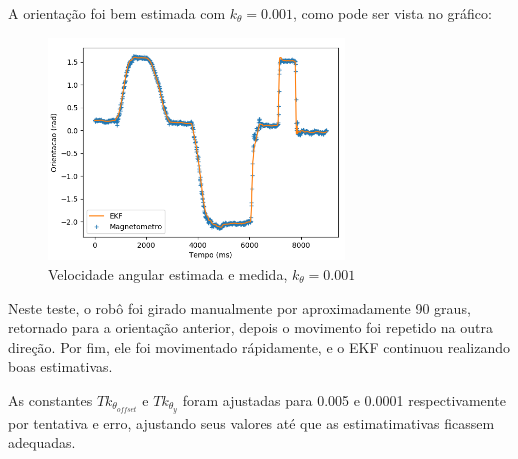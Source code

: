 \documentclass[
	12pt,				%
	openright,			%
	twoside,			%
	convert,
	a4paper,			%
	english,			%
	french,				%
	spanish,			%
	brazil				%
	]{abntex2}
\begin{document}
A orientação foi bem estimada com $k_\theta = 0.001$, como pode ser vista no gráfico:
\begin{figure}[H]
	\caption{Velocidade angular estimada e medida, $k_\theta = 0.001$}
\begin{center}
   \includegraphics[width=0.7\textwidth]{mag_90_ekf}
\end{center}
\end{figure}
Neste teste, o robô foi girado manualmente por aproximadamente 90 graus, retornado para a orientação anterior, depois o movimento foi repetido na outra direção. Por fim, ele foi movimentado rápidamente, e o EKF continuou realizando boas estimativas.
\par
As constantes $Tk_{\theta_{offset}}$ e $Tk_{\theta_y}$ foram ajustadas para 0.005 e 0.0001 respectivamente por tentativa e erro, ajustando seus valores até que as estimatimativas ficassem adequadas.
\end{document}
